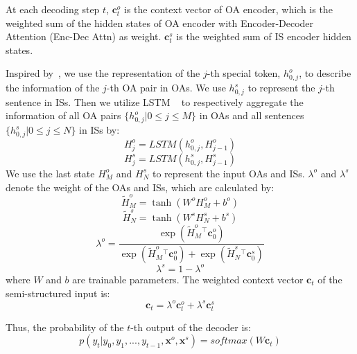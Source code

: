 At each decoding step $t$, 
$\textbf{c}_t^o$ is the context vector of OA encoder, which is the weighted sum of the hidden states of OA 
encoder with Encoder-Decoder Attention (Enc-Dec Attn) as weight. 
$\textbf{c}_t^s$ is the weighted sum of IS encoder hidden states.

Inspired by~\citet{DialogMV2020},
we use the representation of the $j$-th special token, $h^o_{0,j}$,
to describe the information of the $j$-th OA pair in OAs.
We use $h^s_{0,j}$ to represent the $j$-th sentence in ISs.
Then we utilize LSTM ~\cite{LSTM1997}  to respectively 
aggregate the information of all OA pairs
$\{h^o_{0,j}|0\leq{j}\leq{M}\}$ in OAs
and all sentences $\{h^s_{0,j}|0\leq{j}\leq{N}\}$ in ISs by:
\begin{equation}
	H^o_j = LSTM(h^o_{0,j}, H^o_{j-1})
\end{equation}
\begin{equation}
	H^s_j = LSTM(h^s_{0,j}, H^s_{j-1})
\end{equation}
We use the last state $H^o_M$ and $H^s_N$
to represent the input OAs and ISs.
$\lambda^o$ and $\lambda^s$ denote
the weight of the OAs and ISs,
which are calculated by:
\begin{equation}
	\tilde{H}^o_M = \tanh(W^oH^o_M+b^o) 
\end{equation}
\begin{equation}
	\tilde{H}^s_N = \tanh(W^sH^s_N+b^s) 
\end{equation}
\begin{equation}
    \lambda^o = \frac{\exp(\tilde{H}^o_M {^\top} \textbf{c}_0^o)}{\exp(\tilde{H}^o_M {^\top} \textbf{c}_0^o)+\exp(\tilde{H}^s_N {^\top} \textbf{c}_0^s)} 
\end{equation}
\begin{equation}
	\lambda^s = 1-\lambda^o 
\end{equation}
where 
$W$ and $b$ are trainable parameters.
The weighted context vector $\textbf{c}_t$ of 
the semi-structured input is:
\begin{equation}
	\textbf{c}_t = \lambda^o \textbf{c}_t^o +  \lambda^s \textbf{c}_t^s
\end{equation}

Thus, the probability of the $t$-th output of the decoder
is:
\begin{equation}
p(y_t|y_{0}, y_{1},..., y_{t-1},\textbf{x}^o,\textbf{x}^s)=
softmax(W \textbf{c}_t)
\end{equation}





